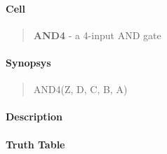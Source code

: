 \label{AND4}
\paragraph{Cell}
\begin{quote}
    \textbf{AND4} - a 4-input AND gate
\end{quote}

\paragraph{Synopsys}
\begin{quote}
    AND4(Z, D, C, B, A)
\end{quote}

\paragraph{Description}



\paragraph{Truth Table}


